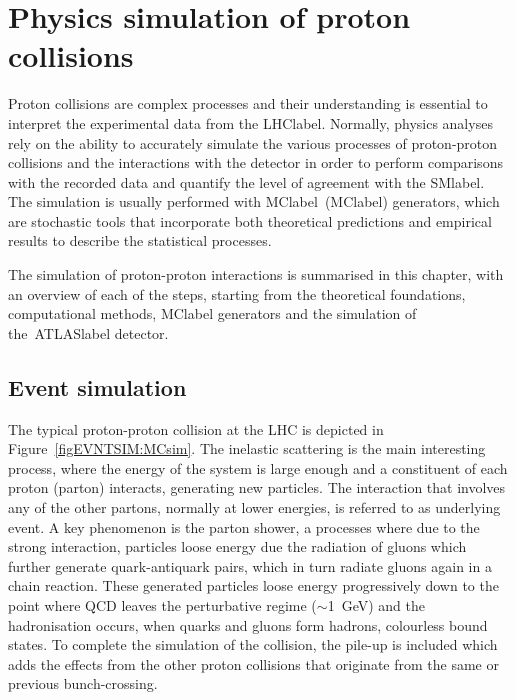 \chapter{Physics simulation of proton collisions}
\label{chapter:EventSim}

Proton collisions are complex processes and their understanding is essential to interpret the experimental data from the \acrshort{LHClabel}. Normally, physics analyses rely on the ability to accurately simulate the various processes of proton-proton collisions and the interactions with the detector in order to perform comparisons with the recorded data and quantify the level of agreement with the \acrshort{SMlabel}. The simulation is usually performed with \acrlong{MClabel}~(\acrshort{MClabel}) generators, which are stochastic tools that incorporate both theoretical predictions and empirical results to describe the statistical processes.

The simulation of proton-proton interactions is summarised in this chapter, with an overview of each of the steps, starting from the theoretical foundations, computational methods, \acrshort{MClabel} generators and the simulation of the~\acrshort{ATLASlabel} detector.

\section{Event simulation}

The typical proton-proton collision at the LHC is depicted in Figure~\ref{figEVNTSIM:MCsim}. The inelastic scattering is the main interesting process, where the energy of the system is large enough and a constituent of each proton (parton) interacts, generating new particles. The interaction that involves any of the other partons, normally at lower energies, is referred to as underlying event. A key phenomenon is the parton shower, a processes where due to the strong interaction, particles loose energy due the radiation of gluons which further generate quark-antiquark pairs, which in turn radiate gluons again in a chain reaction. These generated particles loose energy progressively down to the point where \acrshort{QCD} leaves the perturbative regime ($\sim$1~GeV) and the hadronisation occurs, when quarks and gluons form hadrons, colourless bound states. To complete the simulation of the collision, the pile-up is included which adds the effects from the other proton collisions that originate from the same or previous bunch-crossing.  

